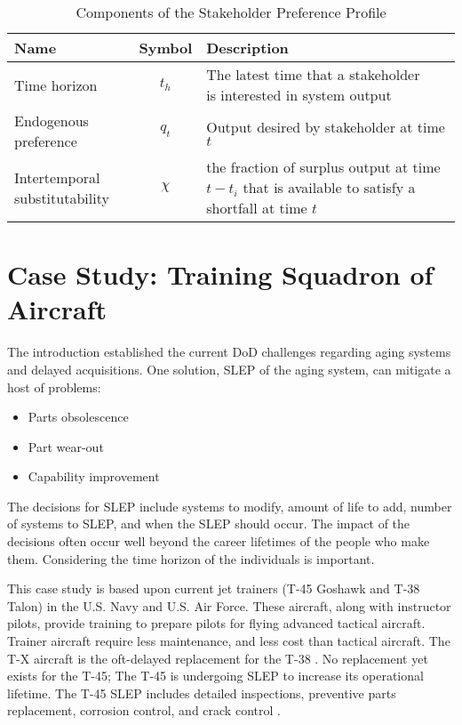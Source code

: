 \begin{table}[h]
  \centering
  \begin{tabular}{l c l}
    \hline
    \hline
    \textbf{Name} & \textbf{Symbol} & \textbf{Description} \\
    \hline
    Time horizon &
    $t_h$ &
    \makecell[l]{The latest time that a stakeholder \\
              is interested in system output} \\
    Endogenous preference &
    $q_t$ &
    \makecell[l]{Output desired by stakeholder\\
              at time $t$} \\
    \makecell[l]{Intertemporal\\substitutability} &
    $\chi$ &
    \makecell[l]{the fraction of surplus output \\
              at time $t-t_i$ that is available \\
              to satisfy a shortfall at time $t$}\\
    \hline
  \end{tabular}
  \caption{Components of the Stakeholder Preference Profile}
  \label{t:StakeParameters}
\end{table}

\section{Case Study: Training Squadron of Aircraft}
\label{s:CaseStudy}
The introduction established the current DoD challenges regarding
aging systems and delayed acquisitions\cite{Burgess2015,LaGrone2016,awstf35}. One solution, SLEP of the
aging system, can mitigate a host of problems: 
\begin{itemize}
\item Parts obsolescence \cite{Tomczykowski2001}
\item Part wear-out \cite{jennings2018}
\item Capability improvement \cite{Burgess2015}
\end{itemize}

The decisions for SLEP include systems to modify, amount of life to add, number of
systems to SLEP, and when the SLEP should occur. The impact of the
decisions often occur well beyond the career lifetimes of the people
who make them. Considering the time horizon of the individuals is important.

This case study is based upon current jet trainers (T-45 Goshawk and
T-38 Talon) in the U.S. Navy and U.S. Air Force. These aircraft, along
with instructor pilots, provide training to prepare pilots for flying advanced tactical
aircraft. Trainer aircraft require less maintenance, and less cost
than tactical aircraft. The T-X aircraft is the
oft-delayed replacement for the T-38 \cite{Mehta2013}. No replacement
yet exists for the T-45; The T-45 is undergoing SLEP to increase its operational
lifetime. The T-45 SLEP includes detailed inspections, preventive parts 
replacement, corrosion control, and crack control \cite{jennings2018}.

